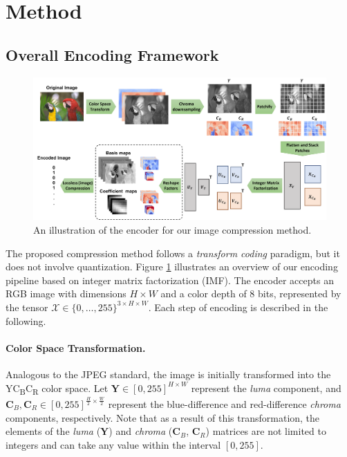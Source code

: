 \section{Method} \label{sec: method}


\subsection{Overall Encoding Framework} \label{sec: overall encoding framework}

\begin{figure}[t]
	\centering
	\includegraphics[width=\linewidth]{figures/imf_encoder.pdf}
	\vspace{10pt}
	\caption{An illustration of the encoder for our image compression method.}
	\label{fig: imf_encoder}
\end{figure}

The proposed compression method follows a \emph{transform coding} paradigm, but it does not involve quantization. Figure \ref{fig: imf_encoder} illustrates an overview of our encoding pipeline based on integer matrix factorization (IMF). The encoder accepts an RGB image with dimensions $H \times W$ and a color depth of 8 bits, represented by the tensor $\bm{\mathcal{X}} \in \{0, \ldots, 255\}^{3 \times H \times W}$. Each step of encoding is described in the following.

\paragraph{Color Space Transformation.}
Analogous to the JPEG standard, the image is initially transformed into the YC\textsubscript{B}C\textsubscript{R} color space. Let $\bm{Y} \in [0, 255]^{H \times W}$ represent the \emph{luma} component, and $\bm{C}_B, \bm{C}_R \in [0, 255]^{\frac{H}{2} \times \frac{W}{2}}$ represent the blue-difference and red-difference \emph{chroma} components, respectively. Note that as a result of this transformation, the elements of the \emph{luma} ($\bm{Y}$) and \emph{chroma} ($\bm{C}_B$, $\bm{C}_R$) matrices are not limited to integers and can take any value within the interval $[0, 255]$.

